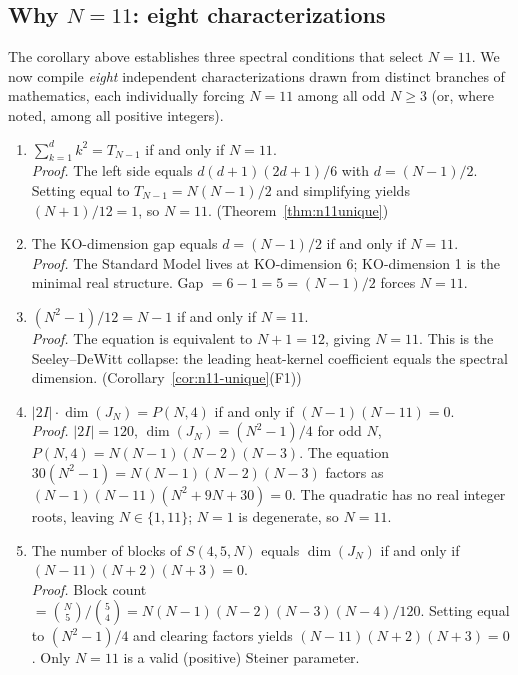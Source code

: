 \documentclass[aps,prd,twocolumn,superscriptaddress,floatfix,nofootinbib]{revtex4-2}
\theoremstyle{definition}
\theoremstyle{remark}
\begin{document}
\subsection{Why \texorpdfstring{$N=11$}{N=11}: eight characterizations}
\label{sec:why-n11}

The corollary above establishes three spectral conditions that select $N=11$.
We now compile \emph{eight} independent characterizations drawn from distinct
branches of mathematics, each individually forcing $N=11$ among all odd
$N \geq 3$ (or, where noted, among all positive integers).

\begin{enumerate}

\item[\textbf{(S75) Algebraic.}]
$\displaystyle\sum_{k=1}^{d} k^2 = T_{N-1}$ if and only if $N = 11$.\\
\emph{Proof.} The left side equals $d(d+1)(2d+1)/6$ with $d=(N-1)/2$.
Setting equal to $T_{N-1}=N(N-1)/2$ and simplifying yields $(N+1)/12=1$,
so $N=11$. \quad (Theorem~\ref{thm:n11unique})

\item[\textbf{(S76a) NCG KO-gap.}]
The KO-dimension gap equals $d=(N-1)/2$ if and only if $N=11$.\\
\emph{Proof.} The Standard Model lives at KO-dimension 6; KO-dimension 1
is the minimal real structure. Gap $= 6-1 = 5 = (N-1)/2$ forces $N=11$.

\item[\textbf{(S76b) Seeley--DeWitt.}]
$(N^2-1)/12 = N-1$ if and only if $N=11$.\\
\emph{Proof.} The equation is equivalent to $N+1 = 12$, giving $N=11$.
This is the Seeley--DeWitt collapse: the leading heat-kernel coefficient
equals the spectral dimension. \quad (Corollary~\ref{cor:n11-unique}(F1))

\item[\textbf{(S76c) Mathieu group.}]
$|2I| \cdot \dim(J_N) = P(N,4)$ if and only if $(N-1)(N-11)=0$.\\
\emph{Proof.} $|2I|=120$, $\dim(J_N)=(N^2-1)/4$ for odd $N$,
$P(N,4)=N(N-1)(N-2)(N-3)$. The equation $30(N^2-1)=N(N-1)(N-2)(N-3)$
factors as $(N-1)(N-11)(N^2+9N+30)=0$. The quadratic has no real integer
roots, leaving $N \in \{1,11\}$; $N=1$ is degenerate, so $N=11$.

\item[\textbf{(S76d) Steiner system.}]
The number of blocks of $S(4,5,N)$ equals $\dim(J_N)$ if and only if
$(N-11)(N+2)(N+3)=0$.\\
\emph{Proof.} Block count $= \binom{N}{5}/\binom{5}{4} = N(N-1)(N-2)(N-3)(N-4)/120$.
Setting equal to $(N^2-1)/4$ and clearing factors yields
$(N-11)(N+2)(N+3)=0$. Only $N=11$ is a valid (positive) Steiner parameter.


\end{enumerate}
\end{document}
